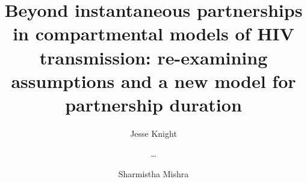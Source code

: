 \title{Beyond instantaneous partnerships in compartmental models of HIV transmission:
  re-examining assumptions and a new model for partnership duration}
\author[1]{Jesse Knight}
\author[1]{\dots}
\author[1]{Sharmistha Mishra}
\abstract{}
\highlights{}
\data{}
\funding{}
\acknowl{}
\contrib{}